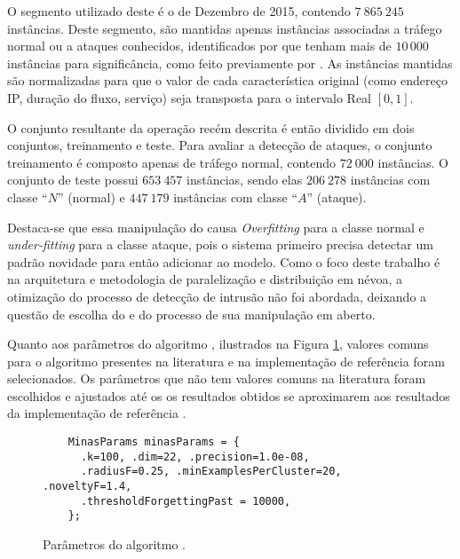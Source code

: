 O segmento utilizado deste \dataset é o de Dezembro de 2015, contendo $7\:865\:245$ instâncias.
Deste segmento, são mantidas apenas instâncias associadas a tráfego normal ou
a ataques conhecidos, identificados por \nids que tenham mais de $10\,000$ instâncias
para significância, como feito previamente por .
As instâncias mantidas são normalizadas para que o valor de cada característica
original (como endereço IP, duração do fluxo, serviço) seja transposta para o
intervalo Real $[0, 1]$.

O conjunto resultante da operação recém descrita é então dividido em dois
conjuntos, treinamento e teste.
Para avaliar a detecção de ataques, o conjunto treinamento é composto apenas de
tráfego normal, contendo $72\:000$ instâncias.
O conjunto de teste possui $653\:457$ instâncias, sendo elas
$206\:278$ instâncias com classe ``$N$'' (normal) e
$447\:179$ instâncias com classe ``$A$'' (ataque).
%

Destaca-se que essa manipulação do \dataset causa \emph{Overfitting} para a classe
normal e \emph{under-fitting} para a classe ataque, pois o sistema primeiro
precisa detectar um padrão novidade para então adicionar ao modelo.
Como o foco deste trabalho é na arquitetura e metodologia de paralelização e
distribuição em névoa, a otimização do processo de detecção de intrusão não foi
abordada, deixando a questão de escolha do \dataset e do processo de sua manipulação
 em aberto.

Quanto aos parâmetros do algoritmo \minas, ilustrados na Figura
\ref{fig:params}, valores comuns para o algoritmo presentes na literatura
\cite{Faria2013Minas,Faria2016minas} e na implementação de referência 
\cite{Faria2013source} foram selecionados.
Os parâmetros que não tem valores comuns na literatura foram escolhidos e
ajustados até os os resultados obtidos se aproximarem aos resultados da
implementação de referência .

\begin{figure}[htb]
  \centering
  \begin{lstlisting}
    MinasParams minasParams = {
      .k=100, .dim=22, .precision=1.0e-08,
      .radiusF=0.25, .minExamplesPerCluster=20, .noveltyF=1.4,
      .thresholdForgettingPast = 10000,
    };
  \end{lstlisting}
  \caption{Parâmetros do algoritmo \minas.}
  \label{fig:params}
\end{figure}

